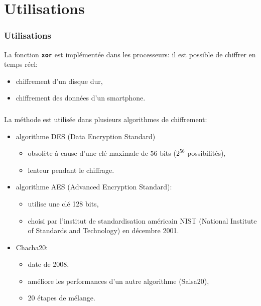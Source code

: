 \documentclass[svgnames,11pt]{beamer}
\begin{document}
\section{Utilisations}
\begin{frame}
    \frametitle{Utilisations}

    La fonction \textbf{\texttt{xor}} est implémentée dans les processeurs: il est possible de chiffrer en temps réel: 
    \begin{itemize}
        \item chiffrement d'un disque dur,
        \item chiffrement des données d'un smartphone.
    \end{itemize}

\end{frame}
\begin{frame}
    \frametitle{}

    La méthode est utilisée dans plusieurs algorithmes de chiffrement:
    \begin{itemize}
        \item<1-> algorithme DES (Data Encryption Standard) \begin{itemize}
            \item obsolète à cause d'une clé maximale de 56 bits ($2^{56}$ possibilités),
            \item lenteur pendant le chiffrage.
        \end{itemize}
        \item<2-> algorithme AES (Advanced Encryption Standard):
        \begin{itemize}
            \item utilise une clé 128 bits,
            \item choisi par l'institut de standardisation américain NIST (National Institute of Standards and Technology) en décembre 2001.
        \end{itemize}
        \item<3-> Chacha20: 
        \begin{itemize}
            \item date de 2008,
            \item améliore les performances d'un autre algorithme (Salsa20),
            \item 20 étapes de mélange.
        \end{itemize}
    \end{itemize}

\end{frame}
\end{document}

